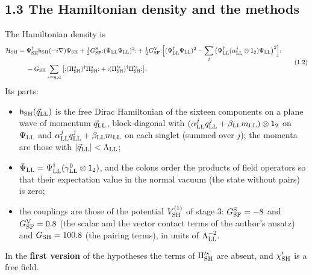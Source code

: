 \documentclass[
  10pt,
]{article}
\providecommand{\tightlist}{%
  \setlength{\itemsep}{0pt}\setlength{\parskip}{0pt}}
\begin{document}
\hypertarget{the-hamiltonian-density-and-the-methods}{%
\subsection{1.3 The Hamiltonian density and the
methods}\label{the-hamiltonian-density-and-the-methods}}

The Hamiltonian density is
\[\begin{aligned}\mathcal H_{\rm SH}={}&\Psi^\dagger_{\rm SH}\mathsf h_{\rm SH}(-i\nabla)\Psi_{\rm SH}+\tfrac12G^{\rm S}_{\rm SF}{:}(\bar\Psi_{\rm LL}\Psi_{\rm LL})^2{:}
+\tfrac12G^{\rm V}_{\rm SF}{:}\Big[(\Psi^\dagger_{\rm LL}\Psi_{\rm LL})^2-\sum_j\big(\Psi^\dagger_{\rm LL}(\alpha^j_{\rm LL}\otimes\mathsf 1_2)\Psi_{\rm LL}\big)^2\Big]{:}\\
&-G_{\rm SH}\sum_{s={\rm u},{\rm d}}\big[{:}(\Pi^s_{\rm SH})^\dagger\Pi^s_{\rm SH}{:}+{:}(\Pi'^s_{\rm SH})^\dagger\Pi'^s_{\rm SH}{:}\big].\end{aligned}\tag{1.2}\]
Its parts:

\begin{itemize}
\tightlist
\item
  \(\mathsf h_{\rm SH}(\vec q_{\rm LL})\) is the free Dirac Hamiltonian
  of the sixteen components on a plane wave of momentum
  \(\vec q_{\rm LL}\), block-diagonal with
  \((\alpha^j_{\rm LL}q^j_{\rm LL}+\beta_{\rm LL}m_{\rm LL})\otimes\mathsf 1_2\)
  on \(\Psi_{\rm LL}\) and
  \(\alpha^j_{\rm LL}q^j_{\rm LL}+\beta_{\rm LL}m_{\rm LL}\) on each
  singlet (summed over \(j\)); the momenta are those with
  \(\lvert\vec q_{\rm LL}\rvert<\Lambda_{\rm LL}\);
\item
  \(\bar\Psi_{\rm LL}=\Psi^\dagger_{\rm LL}(\gamma^0_{\rm LL}\otimes\mathsf 1_2)\),
  and the colons order the products of field operators so that their
  expectation value in the normal vacuum (the state without pairs) is
  zero;
\item
  the couplings are those of the potential \(V^{(1)}_{\rm SH}\) of stage
  3: \(G^{\rm S}_{\rm SF}=-8\) and \(G^{\rm V}_{\rm SF}=0.8\) (the
  scalar and the vector contact terms of the author's ansatz) and
  \(G_{\rm SH}=100.8\) (the pairing terms), in units of
  \(\Lambda_{\rm LL}^{-2}\).
\end{itemize}

In the \textbf{first version} of the hypotheses the terms of
\(\Pi'^s_{\rm SH}\) are absent, and \(\chi'_{\rm SH}\) is a free field.
\end{document}
